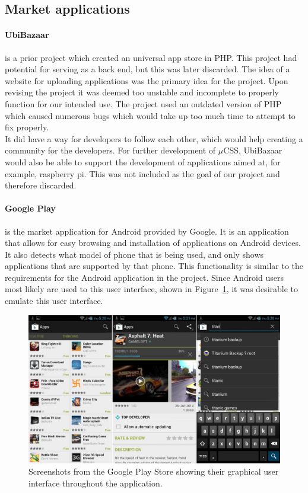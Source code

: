 \subsection{Market applications}
\paragraph{UbiBazaar} is a prior project which created an universal app store in PHP. This project had potential for serving as a back end, but this was later discarded. The idea of a website for uploading applications was the primary idea for the project. Upon revising the project it was deemed too unstable and incomplete to properly function for our intended use. The project used an outdated version of PHP which caused numerous bugs which would take up too much time to attempt to fix properly.\\

It did have a way for developers to follow each other, which would help creating a community for the developers. For further development of $\mu$CSS, UbiBazaar would also be able to support the development of applications aimed at, for example, raspberry pi. This was not included as the goal of our project and therefore discarded.

\paragraph{Google Play} is the market application for Android provided by Google. It is an application that allows for easy browsing and installation of applications on Android devices. It also detects what model of phone that is being used, and only shows applications that are supported by that phone. This functionality is similar to the requirements for the Android application in the project. Since Android users most likely are used to this user interface, shown in Figure~\ref{fig:googleplay}, it was desirable to emulate this user interface.\\

\begin{figure}[H]
\centering
\includegraphics[scale=0.2]{images/Google-Play-Store-APK-3-7-15.jpg}
\caption[Google Play]{Screenshots from the Google Play Store showing their graphical user interface throughout the application.}
\label{fig:googleplay}
\end{figure}

